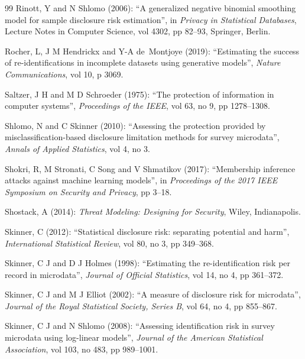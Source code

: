 \documentclass[11pt,a4paper]{article}
\theoremstyle{plain}
\theoremstyle{definition}
\theoremstyle{definition}
\theoremstyle{plain}
\begin{document}
\begin{thebibliography}{99}
Rinott, Y and N Shlomo (2006): ``A generalized negative binomial smoothing model for sample disclosure risk estimation'', in \emph{Privacy in Statistical Databases}, Lecture Notes in Computer Science, vol 4302, pp 82--93, Springer, Berlin.

Rocher, L, J M Hendrickx and Y-A de~Montjoye (2019): ``Estimating the success of re-identifications in incomplete datasets using generative models'', \emph{Nature Communications}, vol 10, p 3069.

Saltzer, J H and M D Schroeder (1975): ``The protection of information in computer systems'', \emph{Proceedings of the IEEE}, vol 63, no 9, pp 1278--1308.

Shlomo, N and C Skinner (2010): ``Assessing the protection provided by misclassification-based disclosure limitation methods for survey microdata'', \emph{Annals of Applied Statistics}, vol 4, no 3.

Shokri, R, M Stronati, C Song and V Shmatikov (2017): ``Membership inference attacks against machine learning models'', in \emph{Proceedings of the 2017 IEEE Symposium on Security and Privacy}, pp 3--18.

Shostack, A (2014): \emph{Threat Modeling: Designing for Security}, Wiley, Indianapolis.

Skinner, C (2012): ``Statistical disclosure risk: separating potential and harm'', \emph{International Statistical Review}, vol 80, no 3, pp 349--368.

Skinner, C J and D J Holmes (1998): ``Estimating the re-identification risk per record in microdata'', \emph{Journal of Official Statistics}, vol 14, no 4, pp 361--372.

Skinner, C J and M J Elliot (2002): ``A measure of disclosure risk for microdata'', \emph{Journal of the Royal Statistical Society, Series B}, vol 64, no 4, pp 855--867.

Skinner, C J and N Shlomo (2008): ``Assessing identification risk in survey microdata using log-linear models'', \emph{Journal of the American Statistical Association}, vol 103, no 483, pp 989--1001.


\end{thebibliography}
\end{document}

